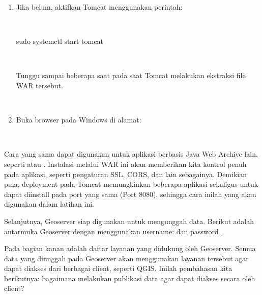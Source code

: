 \documentclass[letterpaper,10pt,english]{sphinxmanual}
\begin{document}
\begin{enumerate}
 

\item {} 
Jika belum, aktifkan Tomcat menggunakan perintah:

 

\begin{sphinxVerbatim}[commandchars=\\\{\}]
sudo systemctl start tomcat
\end{sphinxVerbatim}

 

Tunggu sampai beberapa saat pada saat Tomcat melakukan ekstraksi file WAR tersebut.

 

\item {} 
Buka browser pada Windows di alamat: 

\end{enumerate}

 

Cara yang sama dapat digunakan untuk aplikasi berbasis Java Web Archive lain, seperti  atau . Instalasi melalui WAR ini akan memberikan kita kontrol penuh pada aplikasi, seperti pengaturan SSL, CORS, dan lain sebagainya. Demikian pula, deployment pada Tomcat memungkinkan beberapa aplikasi sekaligus untuk dapat diinstall pada port yang sama (Port 8080), sehingga cara inilah yang akan digunakan dalam latihan ini.

Selanjutnya, Geoserver siap digunakan untuk mengunggah data. Berikut adalah antarmuka Geoserver dengan menggunakan username:  dan password .


Pada bagian kanan adalah daftar layanan yang didukung oleh Geoserver. Semua data yang diunggah pada Geoserver akan menggunakan layanan tersebut agar dapat diakses dari berbagai client, seperti QGIS. Inilah pembahasan kita berikutnya: bagaimana melakukan publikasi data agar dapat diakses secara  oleh client?
\end{document}
